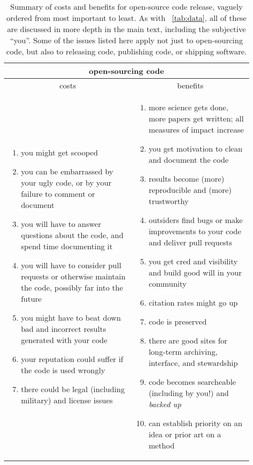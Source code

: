 \documentclass[12pt,twoside,pdftex]{article}
\begin{document}
\begin{table}%
\begin{tabular}{@{}p{\cwidth}|p{\cwidth}@{}}%
\multicolumn{2}{c}{\textbf{open-sourcing code}} \\ \hline
\multicolumn{1}{c|}{costs} & \multicolumn{1}{c}{benefits} \\ \hline
\begin{enumerate}\raggedright
\item you might get scooped
\item you can be embarrassed by your ugly code, or by your failure to comment or document
\item you will have to answer questions about the code, and spend time documenting it
\item you will have to consider pull requests or otherwise maintain the code, possibly far into the future
\item you might have to beat down bad and incorrect results generated with your code
\item your reputation could suffer if the code is used wrongly
\item there could be legal (including military) and license issues
\end{enumerate}&\begin{enumerate}\raggedright
\item more science gets done, more papers get written; all measures of impact increase
\item you get motivation to clean and document the code
\item results become (more) reproducible and (more) trustworthy
\item outsiders find bugs or make improvements to your code and deliver pull requests
\item you get cred and visibility and build good will in your community
\item citation rates might go up
\item code is preserved
\item there are good sites for long-term archiving, interface, and stewardship
\item code becomes searcheable (including by you!) and \emph{backed up}
\item can establish priority on an idea or prior art on a method
\end{enumerate}\end{tabular}
\caption{Summary of costs and benefits for open-source code release,
  vaguely ordered from most important to least. As with
  \tablename~\ref{tab:data}, all of these are discussed in more depth
  in the main text, including the subjective ``you''. Some of the
  issues listed here apply not just to open-sourcing code, but also to
  releasing code, publishing code, or shipping
  software.\label{tab:code}}
\end{table}
\end{document}

